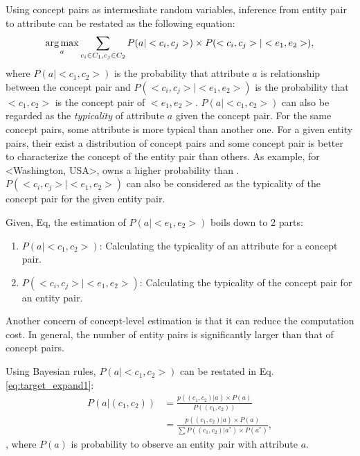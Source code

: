 Using concept pairs as intermediate random variables, inference from entity pair to attribute can be restated as the following equation:
\begin{equation}
\label{eq:target}
\operatorname*{arg\,max}_a \sum_{c_i\in C_1 , c_j \in C_2 }P(a|<c_{i},c_{j}>)\times P(<c_{i},c_{j}>|<e_{1},e_{2}>),
\end{equation}
where $P(a|<c_{1},c_{2}>)$ is the probability that attribute $a$ is relationship between the concept pair and
$P(<c_{i},c_{j}>|<e_{1},e_{2}>)$ is the probability that $<c_1, c_2>$ is the concept pair of $<e_1, e_2>$.  $P(a|<c_{1},c_{2}>)$ can also be regarded as the {\it typicality} of attribute $a$ given the concept pair. For the same concept pairs, some attribute is more typical than another one. 
For a given entity pairs, their exist a distribution of concept pairs and some concept pair is better to characterize the concept of the entity pair than others. As example,  for \ac{<Washington, USA>},   owns a higher probability than .  $P(<c_{i},c_{j}>|<e_{1},e_{2}>)$ can also be considered as the typicality of the concept pair for the given entity pair.

Given, Eq, the estimation of $P(a|<e_1,e_2>)$ boils down to 2 parts:
\begin{enumerate}
\item $P(a|<c_{1},c_{2}>)$: Calculating the typicality of an attribute for a concept pair.
\item $P(<c_{i},c_{j}>|<e_{1},e_{2}>)$: Calculating the typicality of the concept pair for an entity pair.

\end{enumerate}


Another concern of concept-level estimation is that it can reduce the computation cost. In general, the number of entity pairs is significantly larger than that of concept pairs.

Using Bayesian rules, $P(a|<c_{1},c_{2}>)$ can be restated in Eq.\ref{eq:target_expand1}:
\begin{equation}
\label{eq:target_expand1}
\begin{split}
P(a|(c_{1},c_{2})) &= \frac{ p((c_{1},c_{2})|a)\times P(a) }{ P( (c_{1},c_{2}) ) }\\
&=\frac{ p((c_{1},c_{2})|a)\times P(a) }{ \sum{P( (c_{1},c_{2})|a^* )\times P(a^*)   } },
\end{split}
\end{equation},
where $P(a)$ is probability to observe an entity pair with attribute $a$.

